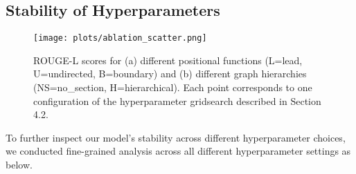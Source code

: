 \documentclass[11pt,a4paper]{article}
\begin{document}
\begin{table}[t]
    \centering
    \caption{\label{table:pubmed-embedding_results}  PubMed test set results with \textsc{HipoRank} framework and different pretrained sentence and section embeddings.}
    \hfill
    \end{table}
    
\subsection{Stability of  Hyperparameters}
\begin{figure}[h!]
        \centering
        \texttt{[image: plots/ablation\_scatter.png]}
        \caption{ROUGE-L scores for (a) different positional functions (L=lead, U=undirected, B=boundary) and (b) different graph hierarchies (NS=no\_section, H=hierarchical). Each point corresponds to one configuration of the hyperparameter gridsearch described in Section 4.2. }
        \label{fig:hyperparams}
    \end{figure}
    
To further inspect our model's stability across different hyperparameter choices, we conducted fine-grained analysis across all different hyperparameter settings as below.
\end{document}
